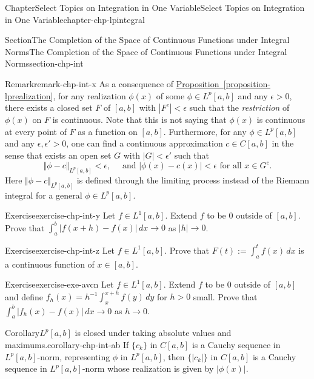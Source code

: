 \documentclass[oneside,10pt,]{book}
\newcommand{\xreffont}{\relax}
\numberwithin{equation}{section}
\begin{document}
\begin{chapterptx}{Chapter}{Select Topics on Integration in One Variable}{}{Select Topics on Integration in One Variable}{}{}{chapter-chp-lpintegral}
\begin{sectionptx}{Section}{The Completion of the Space of Continuous Functions under Integral Norms}{}{The Completion of the Space of Continuous Functions under Integral Norms}{}{}{section-chp-int}
\begin{remark}{Remark}{}{remark-chp-int-x}%
As a consequence of \hyperref[proposition-lprealization]{Proposition~{\xreffont\ref{proposition-lprealization}}}, for any realization \(\phi (x)\) of some \(\phi \in L^{p}[a, b]\) and any \(\epsilon > 0\), there exists a closed set \(F\) of \([a, b]\) with \(|F^{c}| < \epsilon\) such that the \emph{restriction} of \(\phi(x)\) on \(F\) is continuous. Note that this is not saying that \(\phi(x)\) is continuous at every point of \(F\) as a function on \([a, b]\). Furthermore, for any \(\phi \in L^{p}[a, b]\) and any \(\epsilon,
\epsilon' > 0\), one can find a continuous approximation \(c\in C[a, b]\) in the sense that exists an open set \(G\) with \(|G| < \epsilon'\) such that%
\begin{equation*}
\Vert \phi - c \Vert_{L^{p}[a, b]} < \epsilon, \quad\text{ and } \vert \phi (x) - c(x) \vert < \epsilon \text{ for all } x\in G^{c}.
\end{equation*}
Here \(\Vert \phi - c \Vert_{L^{p}[a, b]}\) is defined through the limiting process instead of the Riemann integral for a  general \(\phi \in L^{p}[a, b]\).%
\end{remark}
\begin{inlineexercise}{Exercise}{}{exercise-chp-int-y}%
Let \(f \in L^{1}[a,  b]\). Extend \(f\) to be \(0\) outside of \([a, b]\). Prove that \(\int_{a}^{b}|f(x+h)-f(x)|\, dx \to 0\) as \(|h|\to 0\).%
\end{inlineexercise}%
\begin{inlineexercise}{Exercise}{}{exercise-chp-int-z}%
Let \(f \in L^{1}[a,  b]\). Prove that \(F(t) :=\int_{a}^{t} f(x)\, dx\) is a continuous function of \(x\in [a, b]\).%
\end{inlineexercise}%
\begin{inlineexercise}{Exercise}{}{exercise-exe-avcn}%
Let \(f \in L^{1}[a,  b]\). Extend \(f\) to be \(0\) outside of \([a, b]\) and define \(f_{h}(x)=h^{-1}\int_{x}^{x+h} f(y)\, dy\) for \(h > 0\) small. Prove that \(\int_{a}^{b}|f_{h}(x)-f(x)|\, dx \to 0\) as \(h \to 0\).%
\end{inlineexercise}%
\begin{corollary}{Corollary}{\(L^{p}[a, b]\) is closed under taking absolute values and maximums.}{}{corollary-chp-int-ab}%
If \(\{ c_{k} \}\) in \(C[a, b]\) is a Cauchy sequence in \(L^{p}[a, b]\)-norm, representing \(\phi\) in \(L^{p}[a, b]\), then  \(\{ |c_{k}| \}\) in \(C[a, b]\) is a Cauchy sequence in \(L^{p}[a, b]\)-norm whose realization is given by \(|\phi (x)|\).%

\end{corollary}
\end{sectionptx}
\end{chapterptx}
\end{document}
